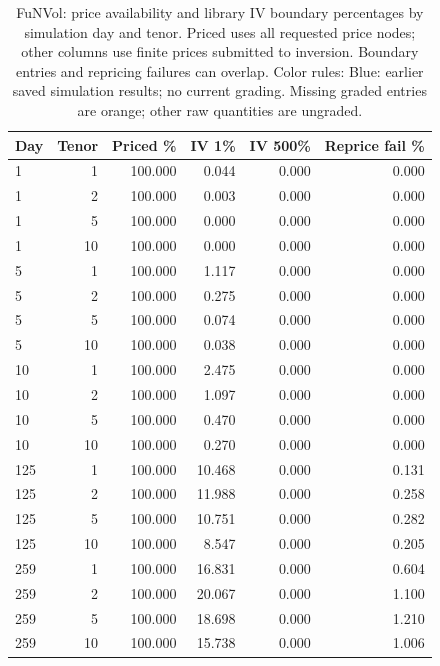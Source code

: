 \documentclass[11pt]{article}
\begin{document}
\begin{table}[H]\centering\small\setlength{\tabcolsep}{4pt}
\caption{FuNVol: price availability and library IV boundary percentages by simulation day and tenor. Priced uses all requested price nodes; other columns use finite prices submitted to inversion. Boundary entries and repricing failures can overlap. Color rules: Blue: earlier saved simulation results; no current grading. Missing graded entries are orange; other raw quantities are ungraded.}\label{tab:literature-boundary-funvol}
\begin{tabular}{@{}lrrrrr@{}}
\toprule
Day & Tenor & Priced \% & IV 1\% & IV 500\% & Reprice fail \% \\
\midrule
1 & 1 & 100.000 & 0.044 & 0.000 & 0.000 \\
1 & 2 & 100.000 & 0.003 & 0.000 & 0.000 \\
1 & 5 & 100.000 & 0.000 & 0.000 & 0.000 \\
1 & 10 & 100.000 & 0.000 & 0.000 & 0.000 \\
5 & 1 & 100.000 & 1.117 & 0.000 & 0.000 \\
5 & 2 & 100.000 & 0.275 & 0.000 & 0.000 \\
5 & 5 & 100.000 & 0.074 & 0.000 & 0.000 \\
5 & 10 & 100.000 & 0.038 & 0.000 & 0.000 \\
10 & 1 & 100.000 & 2.475 & 0.000 & 0.000 \\
10 & 2 & 100.000 & 1.097 & 0.000 & 0.000 \\
10 & 5 & 100.000 & 0.470 & 0.000 & 0.000 \\
10 & 10 & 100.000 & 0.270 & 0.000 & 0.000 \\
125 & 1 & 100.000 & 10.468 & 0.000 & 0.131 \\
125 & 2 & 100.000 & 11.988 & 0.000 & 0.258 \\
125 & 5 & 100.000 & 10.751 & 0.000 & 0.282 \\
125 & 10 & 100.000 & 8.547 & 0.000 & 0.205 \\
259 & 1 & 100.000 & 16.831 & 0.000 & 0.604 \\
259 & 2 & 100.000 & 20.067 & 0.000 & 1.100 \\
259 & 5 & 100.000 & 18.698 & 0.000 & 1.210 \\
259 & 10 & 100.000 & 15.738 & 0.000 & 1.006 \\
\bottomrule\end{tabular}\end{table}
\end{document}
